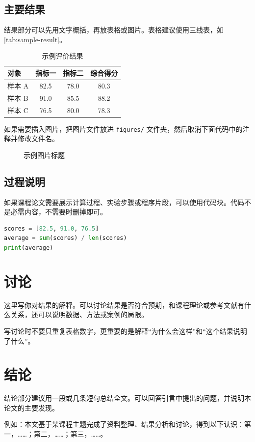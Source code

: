 \subsection{主要结果}

结果部分可以先用文字概括，再放表格或图片。表格建议使用三线表，如 \autoref{tab:sample-result}。

\begin{table}[htbp]
    \centering
    \caption{示例评价结果}
    \label{tab:sample-result}
    \begin{tabularx}{0.8\textwidth}{lCCC}
        \toprule
        对象 & 指标一 & 指标二 & 综合得分 \\
        \midrule
        样本 A & 82.5 & 78.0 & 80.3 \\
        样本 B & 91.0 & 85.5 & 88.2 \\
        样本 C & 76.5 & 80.0 & 78.3 \\
        \bottomrule
    \end{tabularx}
\end{table}

如果需要插入图片，把图片文件放进 \verb|figures/| 文件夹，然后取消下面代码中的注释并修改文件名。

\begin{figure}[htbp]
    \centering
    \caption{示例图片标题}
    \label{fig:sample-image}
\end{figure}

\subsection{过程说明}

如果课程论文需要展示计算过程、实验步骤或程序片段，可以使用代码块。代码不是必需内容，不需要时删掉即可。

\begin{lstlisting}[language=Python, caption=示例代码片段]
scores = [82.5, 91.0, 76.5]
average = sum(scores) / len(scores)
print(average)
\end{lstlisting}

\section{讨论}

这里写你对结果的解释。可以讨论结果是否符合预期，和课程理论或参考文献有什么关系，还可以说明数据、方法或案例的局限。

写讨论时不要只重复表格数字，更重要的是解释“为什么会这样”和“这个结果说明了什么”。

\section{结论}

结论部分建议用一段或几条短句总结全文。可以回答引言中提出的问题，并说明本论文的主要发现。

例如：本文基于某课程主题完成了资料整理、结果分析和讨论，得到以下认识：第一，……；第二，……；第三，……。
